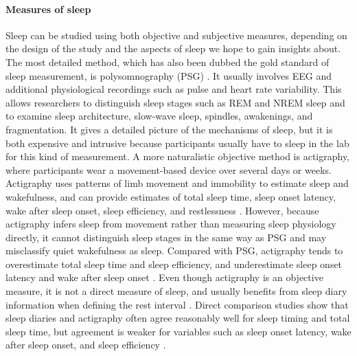 \documentclass[12pt,a4paper]{report}
\begin{document}
\paragraph{Measures of sleep} Sleep can be studied using both objective and subjective measures, depending on the design of the study and the aspects of sleep we hope to gain insights about. The most detailed method, which has also been dubbed the gold standard of sleep measurement, is polysomnography (PSG) \parencite{adamantidis2019oscillating}. It usually involves EEG and additional physiological recordings such as pulse and heart rate variability. This allows researchers to distinguish sleep stages such as REM and NREM sleep and to examine sleep architecture, slow-wave sleep, spindles, awakenings, and fragmentation. It gives a detailed picture of the mechanisms of sleep, but it is both expensive and intrusive because participants usually have to sleep in the lab for this kind of measurement. A more naturalistic objective method is actigraphy, where participants wear a movement-based device over several days or weeks. Actigraphy uses patterns of limb movement and immobility to estimate sleep and wakefulness, and can provide estimates of total sleep time, sleep onset latency, wake after sleep onset, sleep efficiency, and restlessness \parencite{smith2018actigraphy_review, smith2018actigraphy_guideline}. However, because actigraphy infers sleep from movement rather than measuring sleep physiology directly, it cannot distinguish sleep stages in the same way as PSG and may misclassify quiet wakefulness as sleep. Compared with PSG, actigraphy tends to overestimate total sleep time and sleep efficiency, and underestimate sleep onset latency and wake after sleep onset \parencite{conley2019agreement}. Even though actigraphy is an objective measure, it is not a direct measure of sleep, and usually benefits from sleep diary information when defining the rest interval \parencite{smith2018actigraphy_review,smith2018actigraphy_guideline}. Direct comparison studies show that sleep diaries and actigraphy often agree reasonably well for sleep timing and total sleep time, but agreement is weaker for variables such as sleep onset latency, wake after sleep onset, and sleep efficiency \parencite{campanini2017agreement,kearns2023agreement,zhu2018sleepdiaryactigraphy}.
\end{document}
